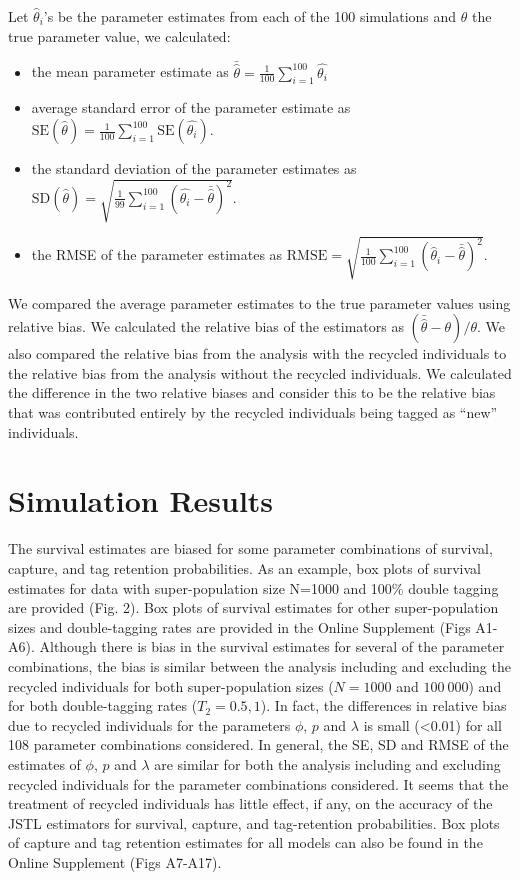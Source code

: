 \documentclass[12pt]{article}
\providecommand{\tightlist}{%
  \setlength{\itemsep}{0pt}\setlength{\parskip}{0pt}}
\begin{document}
Let \(\hat{\theta}_i\)'s be the parameter estimates from each of
the 100 simulations and $\theta$ the true parameter value, we calculated:

\begin{itemize}
\tightlist
\item
  the mean parameter estimate as
  \(\bar{\hat{\theta}}= \frac{1}{100} \sum_{i=1}^{100} \hat{\theta_i}\)
\item
  average standard error of the parameter estimate as
  \(\text{SE}(\hat{\theta})= \frac{1}{100} \sum_{i=1}^{100} \text{SE}(\hat{\theta_i})\).
\item
  the standard deviation of the parameter estimates as
  \(\text{SD}(\hat{\theta})= \sqrt{\frac{1}{99} \sum_{i=1}^{100} (\hat{\theta_i}-\bar{\hat{\theta}})^2}\).
\item
  the RMSE of the parameter estimates as
  \(\text{RMSE}= \sqrt{\frac{1}{100} \sum_{i=1}^{100} (\hat{\theta}_i-\bar{\hat{\theta}})^2} \).
\end{itemize}

We compared the average parameter estimates  to the true parameter
values using relative bias. We calculated the relative bias of the
estimators as \((\bar{\hat{\theta}} -\theta)/\theta\). We also
compared the relative bias from the analysis with the recycled
individuals to the relative bias from the analysis without the recycled
individuals. We calculated the difference in the two relative biases and
consider this to be the relative bias that was contributed entirely by the
recycled individuals being tagged as ``new'' individuals.




\section{Simulation Results}\label{results}

The survival estimates are biased for some
parameter combinations of survival, capture, and tag retention
probabilities. As an example, box plots of survival estimates for data
with super-population size N=1000 and 100\% double tagging are provided
(Fig. 2). Box plots of survival estimates for other super-population
sizes and double-tagging rates are provided in the Online Supplement (Figs
A1-A6). Although there is bias in the survival estimates for several of
the parameter combinations, the bias is similar between the analysis
including and excluding the recycled individuals for both
super-population sizes (\(N=1000\) and \(100\ 000\)) and for both
double-tagging rates (\(T_2=0.5,1\)). In fact, the differences in
relative bias due to recycled individuals for the parameters \(\phi\),
\(p\) and \(\lambda\) is small (\textless{}0.01) for all 108 parameter
combinations considered. In general, the SE, SD and RMSE of the
estimates of \(\phi\), \(p\) and \(\lambda\) are similar for both the
analysis including and excluding recycled individuals for the parameter
combinations considered. It seems that the treatment of
recycled individuals has little effect, if any, on the accuracy of the
JSTL estimators for survival, capture, and tag-retention probabilities.
Box plots of capture and tag retention estimates for all models can also
be found in the Online Supplement (Figs A7-A17).
\end{document}
